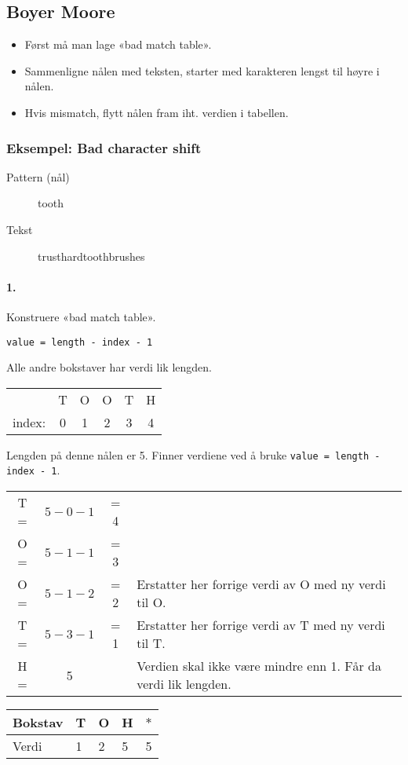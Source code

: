 \documentclass[11pt,a4paper]{article}
\theoremstyle{def}
\begin{document}
\subsection{Boyer Moore}
\begin{itemize}
\item
Først må man lage «bad match table».
\item
Sammenligne nålen med teksten, starter med karakteren lengst til høyre i nålen.
\item
Hvis mismatch, flytt nålen fram iht. verdien i tabellen.
\end{itemize}

\subsubsection{Eksempel: Bad character shift}
\begin{description}
\item[Pattern (nål)] tooth
\item[Tekst] trusthardtoothbrushes
\end{description}

\paragraph{1.} Konstruere «bad match table». 
\begin{center}
\texttt{value = length - index - 1}
\end{center}
Alle andre bokstaver har verdi lik lengden.
\begin{center}
\begin{tabular}{rccccc}
&T&O&O&T&H\\
index:&0&1&2&3&4\\
\end{tabular}
\end{center}
Lengden på denne nålen er 5. Finner verdiene ved å bruke \texttt{value = length - index - 1}.
\begin{center}
\begin{tabular}{cccl}
T = & $5-0-1$&= 4\\
O = & $5-1-1$&= 3\\
O = & $5-1-2$&= 2&Erstatter her forrige verdi av O med ny verdi til O.\\
T = &$5-3-1$& = 1&Erstatter her forrige verdi av T med ny verdi til T.\\
H = &5 &&Verdien skal ikke være mindre enn 1. Får da verdi lik lengden.\\
\end{tabular}

\begin{tabular}{l|llll}
Bokstav&T&O&H&$*$\\
\hline
Verdi&1&2&5&5\\
\end{tabular}
\end{center}
\end{document}
